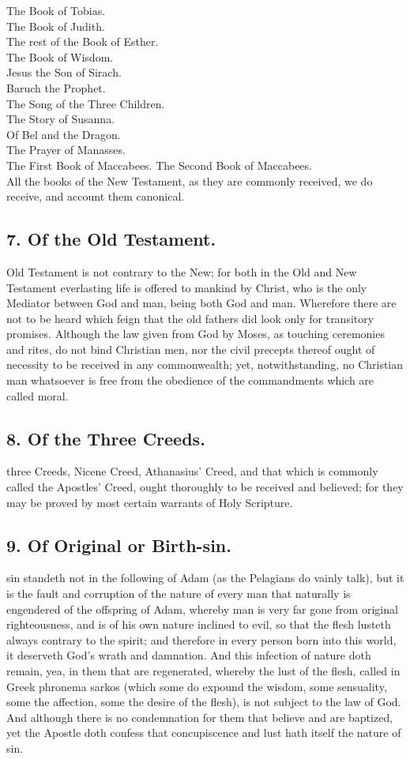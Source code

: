 The Book of Tobias.\\
The Book of Judith.\\
The rest of the Book of Esther.\\
The Book of Wisdom.\\
Jesus the Son of Sirach.\\
Baruch the Prophet.\\
The Song of the Three Children.\\
The Story of Susanna.\\
Of Bel and the Dragon.\\
The Prayer of Manasses.\\
The First Book of Maccabees.
The Second Book of Maccabees.\\
All the books of the New Testament, as they are commonly received, we do receive, and account them canonical.

\subsection{7.  Of the Old Testament.}
 Old Testament is not contrary to the New; for both in the Old and New Testament everlasting life is offered to mankind by Christ, who is the only Mediator between God and man, being both God and man. Wherefore there are not to be heard which feign that the old fathers did look only for transitory promises. Although the law given from God by Moses, as touching ceremonies and rites, do not bind Christian men, nor the civil precepts thereof ought of necessity to be received in any commonwealth; yet, notwithstanding, no Christian man whatsoever is free from the obedience of the commandments which are called moral.

\subsection{8.  Of the Three Creeds.}
 three Creeds, Nicene Creed, Athanasius' Creed, and that which is commonly called the Apostles' Creed, ought thoroughly to be received and believed; for they may be proved by most certain warrants of Holy Scripture.

\subsection{9.  Of Original or Birth-sin.}
 sin standeth not in the following of Adam (as the Pelagians do vainly talk), but it is the fault and corruption of the nature of every man that naturally is engendered of the offspring of Adam, whereby man is very far gone from original righteousness, and is of his own nature inclined to evil, so that the flesh lusteth always contrary to the spirit; and therefore in every person born into this world, it deserveth God's wrath and damnation. And this infection of nature doth remain, yea, in them that are regenerated, whereby the lust of the flesh, called in Greek phronema sarkos (which some do expound the wisdom, some sensuality, some the affection, some the desire of the flesh), is not subject to the law of God. And although there is no condemnation for them that believe and are baptized, yet the Apostle doth confess that concupiscence and lust hath itself the nature of sin.

